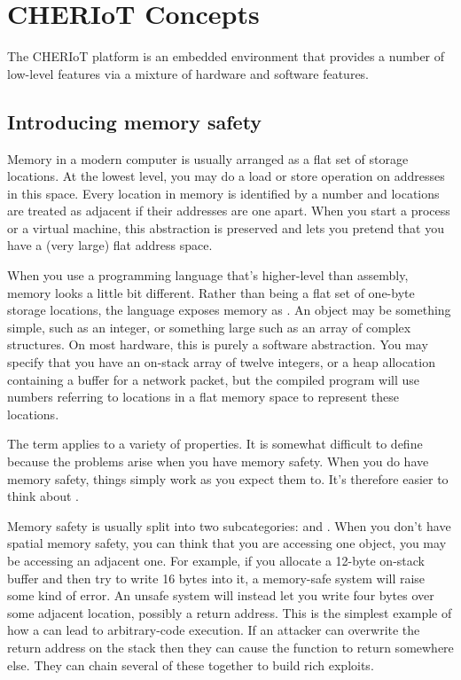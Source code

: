 \chapter[label=concepts]{CHERIoT Concepts}

The CHERIoT platform is an embedded environment that provides a number of low-level features via a mixture of hardware and software features.

\section{Introducing memory safety}

Memory in a modern computer is usually arranged as a flat set of storage locations.
At the lowest level, you may do a load or store operation on addresses in this space.
Every location in memory is identified by a number and locations are treated as adjacent if their addresses are one apart.
When you start a process or a virtual machine, this abstraction is preserved and  lets you pretend that you have a (very large) flat address space.

When you use a programming language that's higher-level than assembly, memory looks a little bit different.
Rather than being a flat set of one-byte storage locations, the language exposes memory as .
An object may be something simple, such as an integer, or something large such as an array of complex structures.
On most hardware, this is purely a software abstraction.
You may specify that you have an on-stack array of twelve integers, or a heap allocation containing a buffer for a network packet, but the compiled program will use numbers referring to locations in a flat memory space to represent these locations.

The term  applies to a variety of properties.
It is somewhat difficult to define because the problems arise when you  have memory safety.
When you do have memory safety, things simply work as you expect them to.
It's therefore easier to think about .

Memory safety is usually split into two subcategories:  and .
When you don't have spatial memory safety, you can think that you are accessing one object, you may be accessing an adjacent one.
For example, if you allocate a 12-byte on-stack buffer and then try to write 16 bytes into it, a memory-safe system will raise some kind of error.
An unsafe system will instead let you write four bytes over some adjacent location, possibly a return address.
This is the simplest example of how a  can lead to arbitrary-code execution.
If an attacker can overwrite the return address on the stack then they can cause the function to return somewhere else.
They can chain several of these together to build rich exploits.

